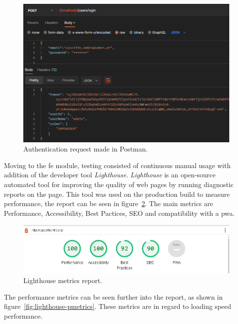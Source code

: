 \begin{figure}[H]
    \centering
    \includegraphics[scale=0.5]{Chapters/img/misc/postman-req-post.png}
    \caption{Authentication request made in Postman.}
    \label{fig:postman-post-req}
\end{figure}

Moving to the \acrshort{fe} module, testing consisted of continuous manual usage with addition of the developer tool \textit{Lighthouse}. \textit{Lighthouse} is an open-source automated tool for improving the quality of web pages by running diagnostic reports on the page. This tool was used on the production build to measure performance, the report can be seen in figure~\ref{fig:lighthouse-report}. The main metrics are Performance, Accessibility, Best Pactices, SEO and compatibility with a \acrshort{pwa}.

\begin{figure}[H]
    \centering
    \includegraphics[scale=0.6]{Chapters/img/lighthouse/report-1-no-pwa.png}
    \caption{Lighthouse metrics report.}
    \label{fig:lighthouse-report}
\end{figure}
 
The performance metrics can be seen further into the report, as shown in figure~\ref{fig:lighthouse-pmetrics}.
These metrics are in regard to loading speed performance.

